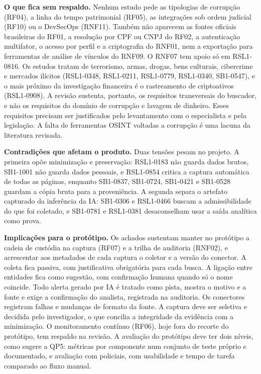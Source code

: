 \textbf{O que fica sem respaldo.} Nenhum estudo pede as tipologias de
corrupção (RF04), a linha do tempo patrimonial (RF05), as integrações sob
ordem judicial (RF10) ou o DevSecOps (RNF11). Também não aparecem as fontes
oficiais brasileiras do RF01, a resolução por CPF ou CNPJ do RF02, a
autenticação multifator, o acesso por perfil e a criptografia do RNF01, nem a
exportação para ferramentas de análise de vínculos do RNF09. O RNF07 tem
apoio só em RSL1-0816. Os estudos tratam de terrorismo, armas, drogas, bens
culturais, cibercrime e mercados ilícitos (RSL1-0348, RSL1-0211, RSL1-0779,
RSL1-0340, SB1-0547), e o mais próximo da investigação financeira é o
rastreamento de criptoativos (RSL1-0908). A revisão sustenta, portanto, os
requisitos transversais do buscador, e não os requisitos do domínio de
corrupção e lavagem de dinheiro. Esses requisitos precisam ser justificados
pelo levantamento com o especialista e pela legislação. A falta de
ferramentas OSINT voltadas a corrupção é uma lacuna da literatura revisada.

\textbf{Contradições que afetam o produto.} Duas tensões pesam no projeto.
A primeira opõe minimização e preservação: RSL1-0183 não guarda dados
brutos, SB1-1001 não guarda dados pessoais, e RSL1-0854 critica a captura
automática de todas as páginas, enquanto SB1-0837, SB1-0724, SB1-0421 e
SB1-0528 guardam a cópia bruta para a proveniência. A segunda separa o
artefato capturado da inferência da IA: SB1-0306 e RSL1-0466 buscam a
admissibilidade do que foi coletado, e SB1-0781 e RSL1-0381 desaconselham
usar a saída analítica como prova.

\textbf{Implicações para o protótipo.} Os achados sustentam manter no
protótipo a cadeia de custódia na captura (RF07) e a trilha de auditoria
(RNF02), e acrescentar aos metadados de cada captura o coletor e a versão do
conector. A coleta fica passiva, com justificativa obrigatória para cada
busca. A ligação entre entidades fica como sugestão, com confirmação humana
quando só o nome coincide. Todo alerta gerado por IA é tratado como pista,
mostra o motivo e a fonte e exige a confirmação do analista, registrada na
auditoria. Os conectores registram falhas e mudanças de formato da fonte. A
captura deve ser seletiva e decidida pelo investigador, o que concilia a
integridade da evidência com a minimização. O monitoramento contínuo (RF06),
hoje fora do recorte do protótipo, tem respaldo na revisão. A avaliação do
protótipo deve ter dois níveis, como sugere a QP5: métricas por componente
num conjunto de teste próprio e documentado, e avaliação com policiais, com
usabilidade e tempo de tarefa comparado ao fluxo manual.
